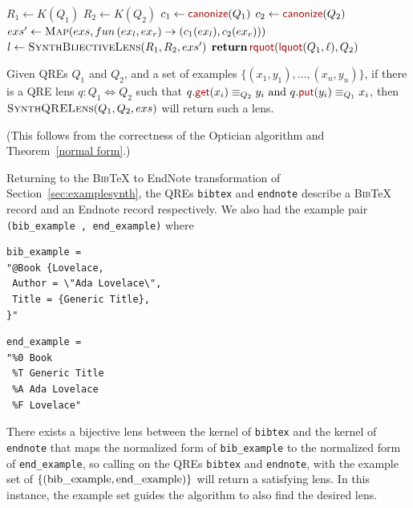 \documentclass[acmsmall,review,anonymous]{acmart}
\newcommand{\kw}[1]{\textcolor{dkred}{\ensuremath{\mathsf{#1}}}}
\newcommand{\canonize}{\ensuremath{\kw{canonize}}}
\newcommand{\bibtex}{\textsc{Bib}\TeX{}}
\newcommand{\get}{\ensuremath{\kw{get}}}
\newcommand{\lput}{\ensuremath{\kw{put}}}
\newcommand{\lquot}{\ensuremath{\kw{lquot}}}
\newcommand{\rquot}{\ensuremath{\kw{rquot}}}
\newcommand{\cd}[1]{\lstinline[backgroundcolor=\color{white}]$#1$}
\begin{document}
\begin{algorithm}
  \caption{}
  \label{alg:synthqrelens}
  \begin{algorithmic}[1]
    \State $R_1 \gets K(Q_1)$
    \State $R_2 \gets K(Q_2)$
    \State $c_1 \gets \canonize(Q_1)$
    \State $c_2 \gets \canonize(Q_2)$
    \State $exs' \gets \Call{Map}{exs,fun \, (ex_l,ex_r) \to
      (c_1(ex_l),c_2(ex_r))}$
    \State $l \gets \Call{SynthBijectiveLens}{R_1,R_2,exs'}$
    \State $\Return \, \rquot(\lquot(Q_1, \ell), Q_2)$
    \EndFunction
  \end{algorithmic}
\end{algorithm}

\noindent
\begin{theorem}\label{thm:alg-correct}
  Given QREs $Q_1$ and $Q_2$, and a set of examples
  $\{(x_1,y_1),\ldots,(x_n,y_n)\}$, if there is a QRE lens $q : Q_1
  \Leftrightarrow Q_2$ such that $q.\get(x_i) \equiv_{Q_2} y_i \text{ and }
q.\lput(y_i) \equiv_{Q_1} x_i$, then $\textproc{SynthQRELens}(Q_1,Q_2,exs)$ will
return such a lens.
\end{theorem}

\noindent
(This follows from the correctness of the Optician algorithm and
Theorem~\ref{normal form}.)

Returning to the \bibtex{} to EndNote transformation of
Section~\ref{sec:examplesynth}, the QREs \cd{bibtex} and \cd{endnote}
describe a \bibtex{} record and an Endnote record respectively. We also had
the example pair \cd{(bib_example , end_example)} where

\begin{center}
\begin{minipage}{2.5in}
\begin{lstlisting}
bib_example =
"@Book {Lovelace,
 Author = \"Ada Lovelace\",
 Title = {Generic Title},
}"
\end{lstlisting}
\end{minipage}
\begin{minipage}{1.5in}
\begin{lstlisting}
end_example =
"%0 Book
 %T Generic Title
 %A Ada Lovelace
 %F Lovelace"
\end{lstlisting}
\end{minipage}
\end{center}

There exists a bijective lens between the kernel of \cd{bibtex} and the kernel
of \cd{endnote} that maps the normalized form of \cd{bib_example} to the
normalized form of \cd{end_example}, so calling  on the
QREs \cd{bibtex} and \cd{endnote}, with the example set of
$\{(\text{\cd{bib\_example}},\text{\cd{end\_example}})\}$ will return a
satisfying lens. In this instance, the example set guides the algorithm to also
find the desired lens.
\end{document}
